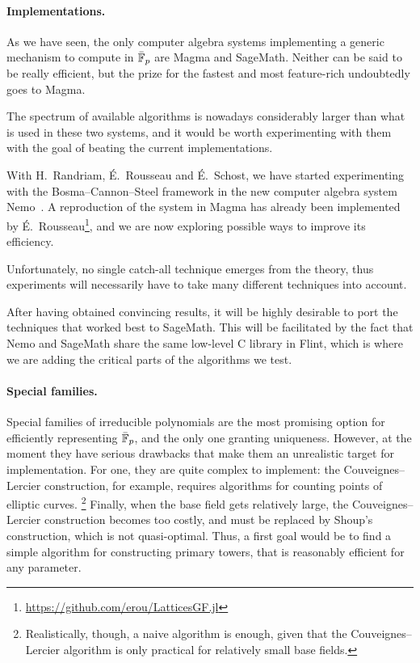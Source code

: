\documentclass{report}
\theoremstyle{plain}
\theoremstyle{definition}
\begin{document}
\paragraph{Implementations.}
As we have seen, the only computer algebra systems implementing a
generic mechanism to compute in $\bar{\mathbb{F}}_p$ are Magma and SageMath. %
Neither can be said to be really efficient, but the prize for the
fastest and most feature-rich undoubtedly goes to Magma. %

The spectrum of available algorithms is nowadays considerably larger
than what is used in these two systems, and it would be worth
experimenting with them with the goal of beating the current
implementations. %

With H.~Randriam, É.~Rousseau and É.~Schost, we have started
experimenting with the Bosma--Cannon--Steel framework in the new
computer algebra system Nemo~\cite{Fieker:2017:NCA:3087604.3087611}. %
A reproduction of the system in Magma has already been implemented by
É.~Rousseau\footnote{\url{https://github.com/erou/LatticesGF.jl}}, and
we are now exploring possible ways to improve its efficiency. %

Unfortunately, no single catch-all technique emerges from the theory,
thus experiments will necessarily have to take many different
techniques into account. %

After having obtained convincing results, it will be highly desirable
to port the techniques that worked best to SageMath. %
This will be facilitated by the fact that Nemo and SageMath share the
same low-level C library in Flint, which is where we are adding the
critical parts of the algorithms we test. %

\paragraph{Special families.}
Special families of irreducible polynomials are the most promising
option for efficiently representing $\bar{\mathbb{F}}_p$, and the only one
granting uniqueness. %
However, at the moment they have serious drawbacks that make them an
unrealistic target for implementation. %
For one, they are quite complex to implement: the Couveignes--Lercier
construction, for example, requires algorithms for counting points of
elliptic curves.%
\footnote{Realistically, though, a naive algorithm is enough, given
  that the Couveignes--Lercier algorithm is only practical for
  relatively small base fields.} %
Finally, when the base field gets relatively large, the
Couveignes--Lercier construction becomes too costly, and must be
replaced by Shoup's construction, which is not quasi-optimal. %
Thus, a first goal would be to find a simple algorithm for
constructing primary towers, that is reasonably efficient for any
parameter. %
\end{document}
